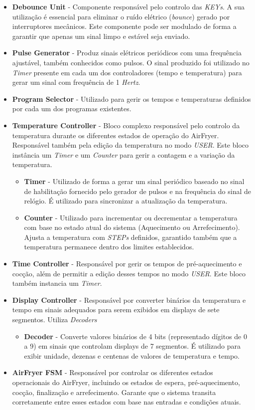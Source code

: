 \documentclass[a4paper, 11pt, onecolumn, oneside]{report}
\begin{document}
\begin{itemize}
    \item \textbf{Debounce Unit} - Componente responsável pelo controlo das \textit{KEYs}. A sua utilização é essencial para eliminar o ruído elétrico (\textit{bounce}) gerado por interruptores mecânicos. Este componente pode ser modulado de forma a garantir que apenas um sinal limpo e estável seja enviado.
    \item \textbf{Pulse Generator} - Produz sinais elétricos periódicos com uma frequência ajustável, também conhecidos como pulsos. O sinal produzido foi utilizado no \textit{Timer} presente em cada um dos controladores (tempo e temperatura) para gerar um sinal com frequência de 1 \textit{Hertz}.
    \item \textbf{Program Selector} - Utilizado para gerir os tempos e temperaturas definidos por cada um dos programas existentes.
    \item \textbf{Temperature Controller} -  Bloco complexo responsável pelo controlo da temperatura durante os diferentes estados de operação do AirFryer. Responsável também pela edição da temperatura no modo \textit{USER}. Este bloco instância um \textit{Timer} e um \textit{Counter} para gerir a contagem e a variação da temperatura.
        \begin{itemize}
            \item \textbf{Timer} - Utilizado de forma a gerar um sinal periódico baseado no sinal de habilitação fornecido pelo gerador de pulsos e na frequência do sinal de relógio. É utilizado para sincronizar a atualização da temperatura.
            \item \textbf{Counter} - Utilizado para incrementar ou decrementar a temperatura com base no estado atual do sistema (Aquecimento ou Arrefecimento). Ajusta a temperatura com \textit{STEPs} definidos, garantido também que a temperatura permanece dentro dos limites establecidos.
        \end{itemize}
    \item \textbf{Time Controller} - Responsável por gerir os tempos de pré-aquecimento e cocção, além de permitir a edição desses tempos no modo \textit{USER}. Este bloco também instancia um \textit{Timer}.
    \item \textbf{Display Controller} - Responsável por converter binários da temperatura e tempo em sinais adequados para serem exibidos em displays de sete segmentos. Utiliza \textit{Decoders}
        \begin{itemize}
            \item \textbf{Decoder} - Converte valores binários de 4 bits (representado dígitos de 0 a 9) em sinais que controlam displays de 7 segmentos. É utilizado para exibir unidade, dezenas e centenas de valores de temperatura e tempo.
        \end{itemize}
    \item \textbf{AirFryer FSM} - Responsável por controlar os diferentes estados operacionais do AirFryer, incluindo os estados de espera, pré-aquecimento, cocção, finalização e arrefecimento. Garante que o sistema transita corretamente entre esses estados com base nas entradas e condições atuais.
\end{itemize}
\end{document}

